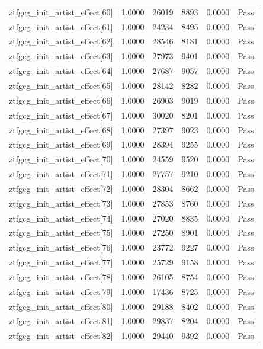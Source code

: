 \begin{table}[htbp]
\begin{tabular}{llrrll}
ztfgcg\_init\_artist\_effect[60] & 1.0000 & 26019 & 8893 & 0.0000 & Pass \\
ztfgcg\_init\_artist\_effect[61] & 1.0000 & 24234 & 8495 & 0.0000 & Pass \\
ztfgcg\_init\_artist\_effect[62] & 1.0000 & 28546 & 8181 & 0.0000 & Pass \\
ztfgcg\_init\_artist\_effect[63] & 1.0000 & 27973 & 9401 & 0.0000 & Pass \\
ztfgcg\_init\_artist\_effect[64] & 1.0000 & 27687 & 9057 & 0.0000 & Pass \\
ztfgcg\_init\_artist\_effect[65] & 1.0000 & 28142 & 8282 & 0.0000 & Pass \\
ztfgcg\_init\_artist\_effect[66] & 1.0000 & 26903 & 9019 & 0.0000 & Pass \\
ztfgcg\_init\_artist\_effect[67] & 1.0000 & 30020 & 8201 & 0.0000 & Pass \\
ztfgcg\_init\_artist\_effect[68] & 1.0000 & 27397 & 9023 & 0.0000 & Pass \\
ztfgcg\_init\_artist\_effect[69] & 1.0000 & 28394 & 9255 & 0.0000 & Pass \\
ztfgcg\_init\_artist\_effect[70] & 1.0000 & 24559 & 9520 & 0.0000 & Pass \\
ztfgcg\_init\_artist\_effect[71] & 1.0000 & 27757 & 9210 & 0.0000 & Pass \\
ztfgcg\_init\_artist\_effect[72] & 1.0000 & 28304 & 8662 & 0.0000 & Pass \\
ztfgcg\_init\_artist\_effect[73] & 1.0000 & 27853 & 8760 & 0.0000 & Pass \\
ztfgcg\_init\_artist\_effect[74] & 1.0000 & 27020 & 8835 & 0.0000 & Pass \\
ztfgcg\_init\_artist\_effect[75] & 1.0000 & 27250 & 8901 & 0.0000 & Pass \\
ztfgcg\_init\_artist\_effect[76] & 1.0000 & 23772 & 9227 & 0.0000 & Pass \\
ztfgcg\_init\_artist\_effect[77] & 1.0000 & 25729 & 9158 & 0.0000 & Pass \\
ztfgcg\_init\_artist\_effect[78] & 1.0000 & 26105 & 8754 & 0.0000 & Pass \\
ztfgcg\_init\_artist\_effect[79] & 1.0000 & 17436 & 8725 & 0.0000 & Pass \\
ztfgcg\_init\_artist\_effect[80] & 1.0000 & 29188 & 8402 & 0.0000 & Pass \\
ztfgcg\_init\_artist\_effect[81] & 1.0000 & 29837 & 8204 & 0.0000 & Pass \\
ztfgcg\_init\_artist\_effect[82] & 1.0000 & 29440 & 9392 & 0.0000 & Pass \\

\end{tabular}
\end{table}
